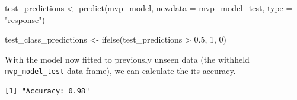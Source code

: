 \documentclass[
  letterpaper,
]{krantz}
\newenvironment{Shaded}{\begin{snugshade}}{\end{snugshade}}
\newcommand{\AttributeTok}[1]{\textcolor[rgb]{0.40,0.45,0.13}{#1}}
\newcommand{\DecValTok}[1]{\textcolor[rgb]{0.68,0.00,0.00}{#1}}
\newcommand{\FloatTok}[1]{\textcolor[rgb]{0.68,0.00,0.00}{#1}}
\newcommand{\FunctionTok}[1]{\textcolor[rgb]{0.28,0.35,0.67}{#1}}
\newcommand{\NormalTok}[1]{\textcolor[rgb]{0.00,0.23,0.31}{#1}}
\newcommand{\OtherTok}[1]{\textcolor[rgb]{0.00,0.23,0.31}{#1}}
\newcommand{\SpecialCharTok}[1]{\textcolor[rgb]{0.37,0.37,0.37}{#1}}
\newcommand{\StringTok}[1]{\textcolor[rgb]{0.13,0.47,0.30}{#1}}
\begin{document}
\begin{Shaded}
\begin{Highlighting}[]
\NormalTok{test\_predictions }\OtherTok{\textless{}{-}} \FunctionTok{predict}\NormalTok{(mvp\_model,}
                            \AttributeTok{newdata =}\NormalTok{ mvp\_model\_test, }\AttributeTok{type =} \StringTok{"response"}\NormalTok{)}

\NormalTok{test\_class\_predictions }\OtherTok{\textless{}{-}} \FunctionTok{ifelse}\NormalTok{(test\_predictions }\SpecialCharTok{\textgreater{}} \FloatTok{0.5}\NormalTok{, }\DecValTok{1}\NormalTok{, }\DecValTok{0}\NormalTok{)}
\end{Highlighting}
\end{Shaded}

With the model now fitted to previously unseen data (the withheld
\texttt{mvp\_model\_test} data frame), we can calculate the its
accuracy.

\begin{Shaded}
\end{Shaded}

\begin{verbatim}
[1] "Accuracy: 0.98"
\end{verbatim}
\end{document}
